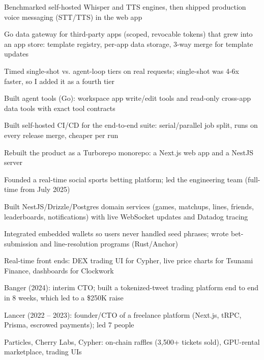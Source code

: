 \documentclass[print]{jack-resume}
\begin{document}
\begin{tightemize}
    \item Benchmarked self-hosted Whisper and TTS engines, then shipped production voice messaging (STT/TTS) in the web app
    \item Go data gateway for third-party apps (scoped, revocable tokens) that grew into an app store: template registry, per-app data storage, 3-way merge for template updates
    \item Timed single-shot vs. agent-loop tiers on real requests; single-shot was 4-6x faster, so I added it as a fourth tier
    \item Built agent tools (Go): workspace app write/edit tools and read-only cross-app data tools with exact tool contracts
    \item Built self-hosted CI/CD for the end-to-end suite: serial/parallel job split, runs on every release merge, cheaper per run
\end{tightemize}
\sectionsep

\begin{tightemize}
    \item Rebuilt the product as a Turborepo monorepo: a Next.js web app and a NestJS server
    \item Founded a real-time social sports betting platform; led the engineering team (full-time from July 2025)
    \item Built NestJS/Drizzle/Postgres domain services (games, matchups, lines, friends, leaderboards, notifications) with live WebSocket updates and Datadog tracing
    \item Integrated embedded wallets so users never handled seed phrases; wrote bet-submission and line-resolution programs (Rust/Anchor)
\end{tightemize}
\sectionsep

\begin{tightemize}
    \item Real-time front ends: DEX trading UI for Cypher, live price charts for Tsunami Finance, dashboards for Clockwork
    \item Banger (2024): interim CTO; built a tokenized-tweet trading platform end to end in 8 weeks, which led to a \$250K raise
    \item Lancer (2022 -- 2023): founder/CTO of a freelance platform (Next.js, tRPC, Prisma, escrowed payments); led 7 people
    \item Particles, Cherry Labs, Cypher: on-chain raffles (3,500+ tickets sold), GPU-rental marketplace, trading UIs
\end{tightemize}
\sectionsep
\end{document}
